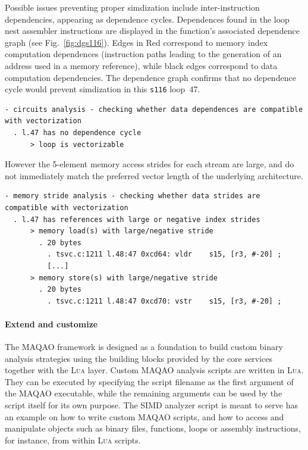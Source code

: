 \documentclass[11pt, a4paper, twoside]{montblanc2}
\def\lua{\textsc{Lua}\xspace}
\begin{document}
Possible issues preventing proper simdization include inter-instruction 
dependencies, appearing as dependence cycles. Dependences found in the loop nest 
assembler instructions are displayed in the function's associated dependence 
graph (see Fig.~\ref{fig:dgs116}). Edges in Red correspond to memory index 
computation dependences (instruction paths leading to the generation of an 
address used in a memory reference), while black edges correspond to data 
computation dependencies. The dependence graph confirms that no dependence cycle 
would prevent simdization in this \texttt{s116} loop~47.

\begin{small}
\begin{verbatim}
- circuits analysis - checking whether data dependences are compatible with vectorization
  . l.47 has no dependence cycle
      > loop is vectorizable
\end{verbatim}
\end{small}

However the 5-element memory access strides for each stream are large, and do not immediately
match the preferred vector length of the underlying architecture.

\begin{small}
\begin{verbatim}
- memory stride analysis - checking whether data strides are compatible with vectorization
  . l.47 has references with large or negative index strides
      > memory load(s) with large/negative stride
        . 20 bytes
          . tsvc.c:1211 l.48:47 0xcd64: vldr	s15, [r3, #-20] ;
          [...]
      > memory store(s) with large/negative stride
        . 20 bytes
          . tsvc.c:1211 l.48:47 0xcd70: vstr	s15, [r3, #-20] ;
\end{verbatim}
\end{small}

\paragraph{Extend and customize}

The MAQAO framework is designed as a foundation to build custom binary analysis strategies using the 
building blocks provided by the core services together with the \lua layer. Custom MAQAO analysis 
scripts are written in \lua. They can be executed by specifying the script filename as the first 
argument of the MAQAO executable, while the remaining arguments can be used by the script itself for 
its own purpose. The SIMD analyzer script is meant to serve has an example on how to write custom 
MAQAO scripts, and how to access and manipulate objects such as binary files, functions, loops or 
assembly instructions, for instance, from within \lua scripts.
\end{document}
